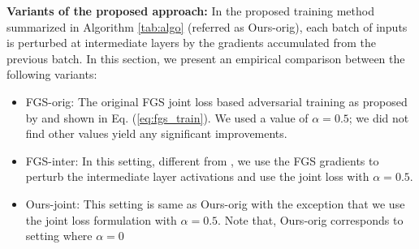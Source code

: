 \documentclass[letterpaper]{article} %
\begin{document}
\textbf{Variants of the proposed approach:}\label{subsec:variants} In the proposed training method summarized in Algorithm \ref{tab:algo} (referred as Ours-orig), each batch of inputs is perturbed at intermediate layers by the gradients accumulated from the previous batch. In this section, we present an empirical comparison between the following variants:
\begin{itemize}
\item FGS-orig: The original FGS joint loss based adversarial training as proposed by \cite{goodfellow2014explaining} and shown in Eq. (\ref{eq:fgs_train}). We used a value of $\alpha=0.5$; we did not find other values yield any significant improvements. %
\item FGS-inter: In this setting, different from \cite{goodfellow2014explaining}, we use the FGS gradients to perturb the intermediate layer activations and use the joint loss with $\alpha=0.5$.
\item Ours-joint: This setting is same as Ours-orig with the exception that we use the joint loss formulation with $\alpha=0.5$. Note that, Ours-orig corresponds to setting where $\alpha=0$
\end{itemize}

\begin{table}[h!]
\begin{center}
\label{tab:variants}
\end{center}
\end{table}
\end{document}
